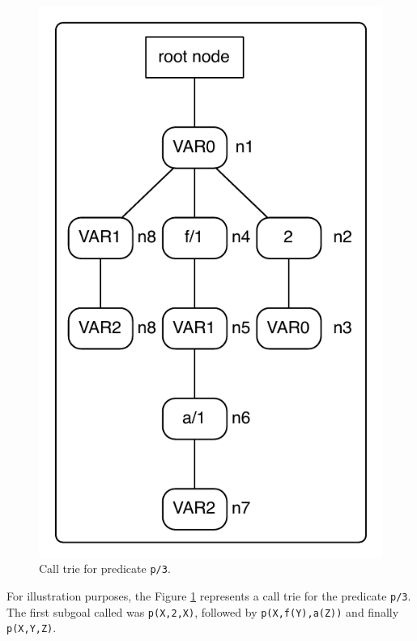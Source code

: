 \begin{figure}[ht]
  \centering
    \includegraphics[scale=0.6]{sub_call_search.pdf}
  \caption{Call trie for predicate \texttt{p/3}.}
  \label{fig:sub_call_search}
\end{figure}

For illustration purposes, the Figure \ref{fig:sub_call_search} represents a call trie for the predicate \texttt{p/3}.
The first subgoal called was \texttt{p(X,2,X)}, followed by \texttt{p(X,f(Y),a(Z))} and finally \texttt{p(X,Y,Z)}.

